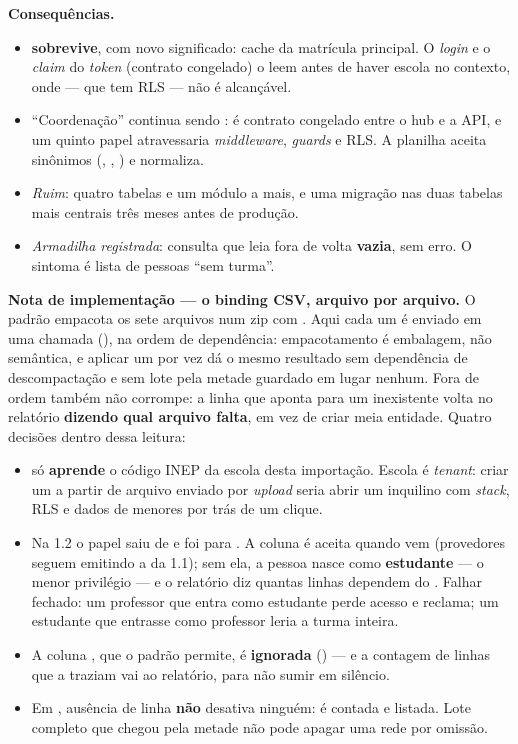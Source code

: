 \textbf{Consequências.}
\begin{itemize}
  \item {} \textbf{sobrevive}, com novo significado: cache da
    matrícula principal. O \emph{login} e o \emph{claim}  do
    \emph{token} (contrato congelado) o leem antes de haver escola no contexto,
    onde  --- que tem RLS --- não é alcançável.
  \item \enquote{Coordenação} continua sendo :  é contrato
    congelado entre o hub e a API, e um quinto papel atravessaria
    \emph{middleware}, \emph{guards} e RLS. A planilha aceita sinônimos
    (, , ) e normaliza.
  \item \emph{Ruim}: quatro tabelas e um módulo a mais, e uma migração nas duas
    tabelas mais centrais três meses antes de produção.
  \item \emph{Armadilha registrada}: consulta que leia  fora de
     volta \textbf{vazia}, sem erro. O sintoma é lista de pessoas
    \enquote{sem turma}.
\end{itemize}

\textbf{Nota de implementação --- o binding CSV, arquivo por arquivo.} O padrão
empacota os sete arquivos num zip com . Aqui cada um é enviado
em uma chamada (), na ordem de
dependência: empacotamento é embalagem, não semântica, e aplicar um por vez dá o
mesmo resultado sem dependência de descompactação e sem lote pela metade guardado
em lugar nenhum. Fora de ordem também não corrompe: a linha que aponta para um
 inexistente volta no relatório \textbf{dizendo qual arquivo
falta}, em vez de criar meia entidade. Quatro decisões dentro dessa leitura:

\begin{itemize}
  \item {} só \textbf{aprende} o código INEP da escola desta
    importação. Escola é \emph{tenant}: criar um a partir de arquivo enviado por
    \emph{upload} seria abrir um inquilino com \emph{stack}, RLS e dados de
    menores por trás de um clique.
  \item Na 1.2 o papel saiu de  e foi para . A
    coluna  é aceita quando vem (provedores seguem emitindo a da 1.1);
    sem ela, a pessoa nasce como \textbf{estudante} --- o menor privilégio --- e o
    relatório diz quantas linhas dependem do . Falhar fechado: um
    professor que entra como estudante perde acesso e reclama; um estudante que entrasse
    como professor leria a turma inteira.
  \item A coluna , que o padrão permite, é \textbf{ignorada}
    () --- e a contagem de linhas que a traziam vai ao relatório,
    para não sumir em silêncio.
  \item Em , ausência de linha \textbf{não} desativa ninguém: é
    contada e listada. Lote completo que chegou pela metade não pode apagar uma
    rede por omissão.
\end{itemize}

